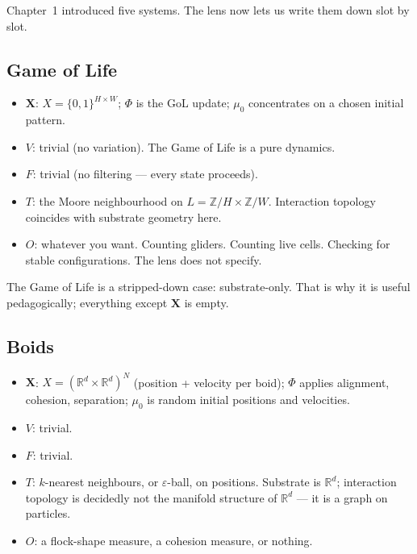 Chapter~1 introduced five systems. The lens now lets us write them down
slot by slot.

\subsection*{Game of Life}

\begin{itemize}[leftmargin=1.5em,itemsep=2pt]
  \item $\mathbf{X}$: $X = \{0,1\}^{H\times W}$; $\Phi$ is the GoL
    update; $\mu_0$ concentrates on a chosen initial pattern.
  \item $V$: trivial (no variation). The Game of Life is a pure
    dynamics.
  \item $F$: trivial (no filtering --- every state proceeds).
  \item $T$: the Moore neighbourhood on $L = \mathbb{Z}/H \times
    \mathbb{Z}/W$. Interaction topology coincides with substrate
    geometry here.
  \item $O$: whatever you want. Counting gliders. Counting live cells.
    Checking for stable configurations. The lens does not specify.
\end{itemize}

The Game of Life is a stripped-down case: substrate-only. That is why
it is useful pedagogically; everything except $\mathbf{X}$ is empty.

\subsection*{Boids}

\begin{itemize}[leftmargin=1.5em,itemsep=2pt]
  \item $\mathbf{X}$: $X = (\mathbb{R}^d \times \mathbb{R}^d)^N$
    (position + velocity per boid); $\Phi$ applies alignment, cohesion,
    separation; $\mu_0$ is random initial positions and velocities.
  \item $V$: trivial.
  \item $F$: trivial.
  \item $T$: $k$-nearest neighbours, or $\varepsilon$-ball, on
    positions. Substrate is $\mathbb{R}^d$; interaction topology is
    decidedly not the manifold structure of $\mathbb{R}^d$ --- it is a
    graph on particles.
  \item $O$: a flock-shape measure, a cohesion measure, or nothing.
\end{itemize}

